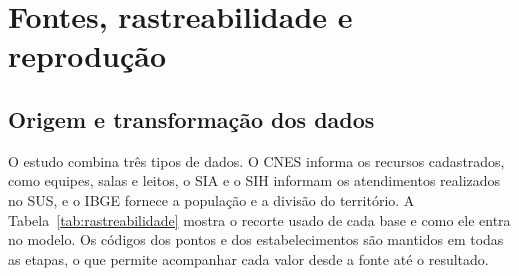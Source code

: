 \appendix
\chapter{Fontes, rastreabilidade e reprodução}\label{ap:reproducao}

\section{Origem e transformação dos dados}
O estudo combina três tipos de dados. O CNES informa os recursos cadastrados, como equipes, salas e
leitos, o SIA e o SIH informam os atendimentos realizados no SUS, e o IBGE fornece a população e a
divisão do território. A Tabela~\ref{tab:rastreabilidade} mostra o recorte usado de cada base e como
ele entra no modelo. Os códigos dos pontos e dos estabelecimentos são mantidos em todas as etapas, o
que permite acompanhar cada valor desde a fonte até o resultado.

